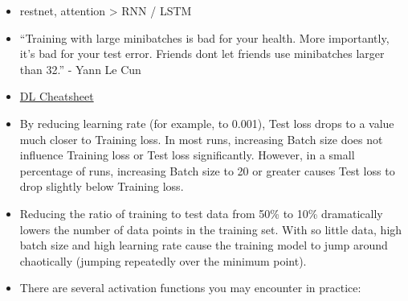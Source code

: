 \documentclass[]{book}
\theoremstyle{definition}
\theoremstyle{definition}
\theoremstyle{definition}
\theoremstyle{remark}
\begin{document}
\begin{itemize}
\item
  restnet, attention \textgreater{} RNN / LSTM
\item
  ``Training with large minibatches is bad for your health. More
  importantly, it's bad for your test error. Friends dont let friends
  use minibatches larger than 32.'' - Yann Le Cun
\item
  \href{https://hackernoon.com/deep-learning-cheat-sheet-25421411e460}{DL
  Cheatsheet}
\item
  By reducing learning rate (for example, to 0.001), Test loss drops to
  a value much closer to Training loss. In most runs, increasing Batch
  size does not influence Training loss or Test loss significantly.
  However, in a small percentage of runs, increasing Batch size to 20 or
  greater causes Test loss to drop slightly below Training loss.
\item
  Reducing the ratio of training to test data from 50\% to 10\%
  dramatically lowers the number of data points in the training set.
  With so little data, high batch size and high learning rate cause the
  training model to jump around chaotically (jumping repeatedly over the
  minimum point).
\item
  There are several activation functions you may encounter in practice:


\end{itemize}
\end{document}
